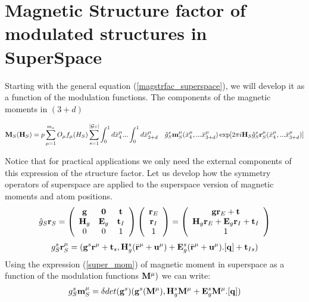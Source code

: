 \documentclass[10pt]{article}
\begin{document}
\section{Magnetic Structure factor of modulated structures in SuperSpace}

Starting with the general equation (\ref{magstrfac_superspace}), we will develop it as a function of the modulation functions.
The components of the magnetic moments in $(3+d)$

\begin{eqnarray} \label{magstrfac_superspace2}
{\bf M}_S({\bf H}_S)= p \sum\limits_{\mu=1}^{m_a} O_\mu f_\mu(H_S)  \sum\limits_{s=1}^{|\mathcal G_S|} \int_{0}^{1} d\bar x_4^\mu ... \int_{0}^{1} d\bar x_{3+d}^\mu \quad \hat g^s_S{\bf m}_S^\mu(\bar x_4^\mu, ...\bar x_{3+d}^\mu) \exp[2\pi i {\bf H}_S \hat g^s_S {\bf r}_S^{\mu}(\bar x_4^\mu, ...\bar x_{3+d}^\mu)]
\end{eqnarray}

Notice that for practical applications we only need the external components of this expression of the structure factor. Let us develop how the symmetry operators of superspace are applied to the superspace version of magnetic moments and atom positions. 
\begin{equation}  
\begin{array} {l}
{\hat g}_S {\bf r}_S= \left( {\begin{array}{*{20}{c}}
	{\bf g}    &{\bf 0}    &{\bf t}\\
	{{\bf H}_g}&{{\bf E}_g}&{\bf t}_I\\
	{0}     &{0}        &{1}
	\end{array}} \right)  \left( {\begin{array}{*{15}{c}} {\bf r}_E \\ {\bf r}_I \\ {1} \end{array}} \right)=
\left( {\begin{array}{*{15}{c}} {\bf g} {\bf r}_E + {\bf t} \\ {\bf H}_g{\bf r}_E + {\bf E}_g{\bf r}_I + {\bf t}_I\\ {1} \end{array}} \right)
\end{array}
\end{equation}
\begin{eqnarray} \label{Opertor_action_rs}
g^s_S {\bf r}_S^{\mu}=({\bf g}^s {\bf r}^\mu  + {\bf t}_s,{\bf H}_g^s(\bar{\bf r}^\mu + {\bf u}^\mu) + {\bf E}_g^s(\bar{\bf r}^\mu + {\bf u}^\mu).[{\bf q}]+ {\bf t}_{Is} )
\end{eqnarray}
Using the expression (\ref{super_mom}) of magnetic moment in superspace as a function of the modulation functions ${\bf M}^\mu)$ we can write: 
\begin{eqnarray} \label{Opertor_action_ms}
g^s_S {\bf m}_S^{\mu}=\delta det({\bf g}^s)({\bf g}^s ({\bf M}^\mu),{\bf H}_g^s  {\bf M}^\mu + {\bf E}_g^s  {\bf M}^\mu.[{\bf q}] )
\end{eqnarray}
\end{document}
